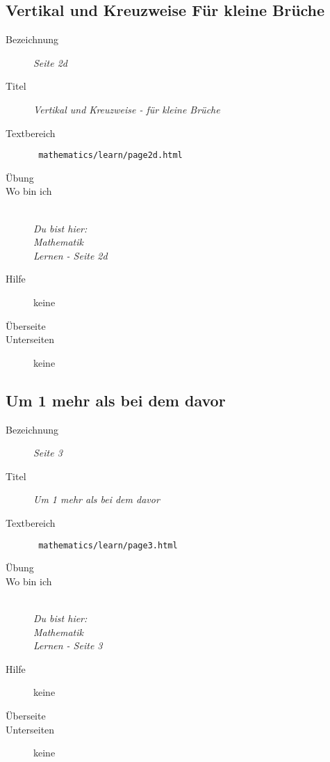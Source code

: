 \subsection{ Vertikal und Kreuzweise Für kleine Brüche }
\label{cha:math-learn-page2d}
\begin{description}
  \item[Bezeichnung] \emph{ Seite 2d }
  \item[Titel] \emph{ Vertikal und Kreuzweise - für kleine Brüche }
  \item[Textbereich] \texttt{ mathematics/learn/page2d.html }
  \item[Übung] 
  \item[Wo bin ich] \emph{\\Du bist hier:\\Mathematik\\Lernen - Seite 2d}
  \item[Hilfe] keine
  \item[Überseite] 
  \item[Unterseiten] keine
\end{description}


\subsection{ Um 1 mehr als bei dem davor }
\label{cha:math-learn-page3}
\begin{description}
  \item[Bezeichnung] \emph{ Seite 3 }
  \item[Titel] \emph{ Um 1 mehr als bei dem davor }
  \item[Textbereich] \texttt{ mathematics/learn/page3.html }
  \item[Übung] 
  \item[Wo bin ich] \emph{\\Du bist hier:\\Mathematik\\Lernen - Seite 3 }
  \item[Hilfe] keine
  \item[Überseite] 
  \item[Unterseiten] keine
\end{description}


